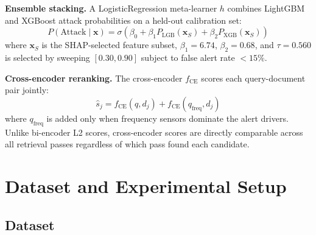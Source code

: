 \documentclass[twocolumn, 10pt, letterpaper]{article}
\begin{document}
\textbf{Ensemble stacking.}
A LogisticRegression meta-learner $h$ combines LightGBM and XGBoost attack
probabilities on a held-out calibration set:
\begin{equation}
    P(\text{Attack} \mid \mathbf{x}) =
    \sigma\!\left(\beta_0 + \beta_1 P_{\text{LGB}}(\mathbf{x}_S) + \beta_2 P_{\text{XGB}}(\mathbf{x}_S)\right)
\end{equation}
where $\mathbf{x}_S$ is the SHAP-selected feature subset, $\beta_1 = 6.74$,
$\beta_2 = 0.68$, and $\tau = 0.560$ is selected by sweeping $[0.30, 0.90]$
subject to false alert rate $< 15\%$.

\textbf{Cross-encoder reranking.}
The cross-encoder $f_{\text{CE}}$ scores each query-document pair jointly:
\begin{equation}
    \hat{s}_j = f_{\text{CE}}(q, d_j) + f_{\text{CE}}(q_{\text{freq}}, d_j)
\end{equation}
where $q_{\text{freq}}$ is added only when frequency sensors dominate the alert
drivers.
Unlike bi-encoder L2 scores, cross-encoder scores are directly comparable across
all retrieval passes regardless of which pass found each candidate.

\section{Dataset and Experimental Setup}
\label{sec:setup}

\subsection{Dataset}
\end{document}
